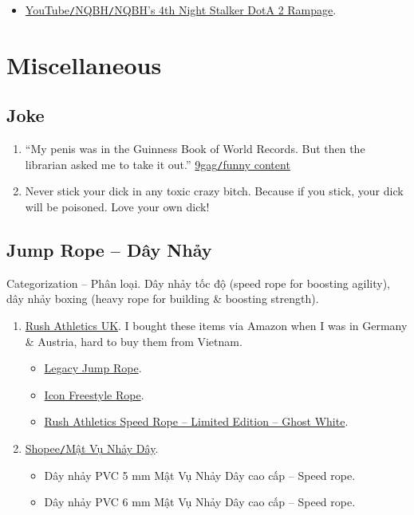 \documentclass{article}
\begin{document}
\begin{itemize}
	\item \href{https://www.youtube.com/watch?v=d9vmHp-4f3k}{YouTube{\tt/}NQBH{\tt/}NQBH's 4th Night Stalker DotA 2 Rampage}.
\end{itemize}


\section{Miscellaneous}

\subsection{Joke}

\begin{enumerate}
	\item ``My penis was in the Guinness Book of World Records. But then the librarian asked me to take it out.'' \href{https://9gag.com/gag/aPZPm6q}{9gag{\tt/}funny content}
	\item Never stick your dick in any toxic crazy bitch. Because if you stick, your dick will be poisoned. Love your own dick!
\end{enumerate}

\subsection{Jump Rope -- Dây Nhảy}
{\sf Categorization -- Phân loại.} Dây nhảy tốc độ (speed rope for boosting agility), dây nhảy boxing (heavy rope for building \& boosting strength).
\begin{enumerate}
	\item \href{https://www.rushathletics.co.uk}{Rush Athletics UK}. I bought these items via Amazon when I was in Germany \& Austria, hard to buy them from Vietnam.
	\begin{itemize}
		\item \href{https://www.rushathletics.co.uk/collections/ropes/products/legacy-jump-rope}{Legacy Jump Rope}.
		\item \href{https://www.rushathletics.co.uk/collections/ropes/products/icon-freestyle-rope}{Icon Freestyle Rope}.
		\item \href{https://www.rushathletics.co.uk/collections/ropes/products/rush-athletics-speed-rope-ghost-white}{Rush Athletics Speed Rope -- Limited Edition -- Ghost White}.
	\end{itemize}	
	\item \href{https://shopee.vn/matvunhayday?categoryId=100637&entryPoint=ShopByPDP&itemId=14803106033}{Shopee{\tt/}Mật Vụ Nhảy Dây}.
	\begin{itemize}
		\item Dây nhảy PVC 5 mm Mật Vụ Nhảy Dây cao cấp -- Speed rope.
		\item Dây nhảy PVC 6 mm Mật Vụ Nhảy Dây cao cấp -- Speed rope.
	\end{itemize}
\end{enumerate}
\end{document}
